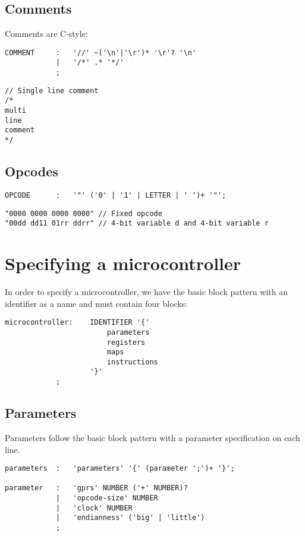 \subsection{Comments}
Comments are C-style:

\lstset{caption=Comment specifation}
\begin{lstlisting}
COMMENT		:	'//' ~('\n'|'\r')* '\r'? '\n'
			|	'/*' .* '*/'
			;
\end{lstlisting}

\lstset{caption=Example comments}
\begin{lstlisting}
// Single line comment
/*
multi
line
comment
*/
\end{lstlisting}

\subsection{Opcodes}
\lstset{caption=Opcode specifation}
\begin{lstlisting}
OPCODE		:	'"' ('0' | '1' | LETTER | ' ')+ '"';
\end{lstlisting}

\lstset{caption=Example Opcodes}
\begin{lstlisting}
"0000 0000 0000 0000" // Fixed opcode
"00dd dd11 01rr ddrr" // 4-bit variable d and 4-bit variable r
\end{lstlisting}

\section{Specifying a microcontroller}
In order to specify a microcontroller, we have the basic block pattern with an
identifier as a name and must contain four blocks:
\lstset{caption=Microcontroller specification}
\begin{lstlisting}
microcontroller:	IDENTIFIER '{'
						parameters
						registers
						maps
						instructions
					'}'
			;
\end{lstlisting}

\subsection{Parameters}
Parameters follow the basic block pattern with a parameter specification on
each line.

\lstset{caption=Parameter specification}
\begin{lstlisting}
parameters	:	'parameters' '{' (parameter ';')+ '}';

parameter	:	'gprs' NUMBER ('+' NUMBER)?
			|	'opcode-size' NUMBER
			|	'clock' NUMBER
			|	'endianness' ('big' | 'little')
			;
\end{lstlisting}

